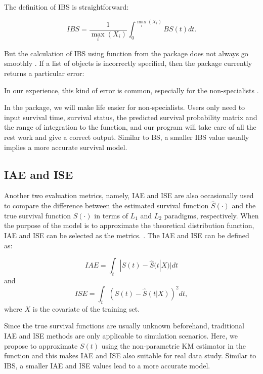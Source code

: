 The definition of IBS is straightforward:

\begin{equation}\label{IBS}
  IBS=\frac{1}{\max\limits_i{(X_i)}} \int_0^{\max\limits_i(X_i)}BS(t)dt.
\end{equation}

But the calculation of IBS using  function from the  package does not always go smoothly \citep{ipred.2009} . If a list of  objects is incorrectly specified, then the package currently returns a particular error:


In our experience, this kind of error is common, especially for the non-specialists \citep{ipred.2009}.

In the  package,  we will make life easier for non-specialists.  Users only need to input survival time, survival status, the predicted survival probability matrix and the range of integration to the  function, and our program will take care of all the rest work and give a correct output. Similar to BS, a smaller IBS value usually implies a more accurate survival model.

\subsection{IAE and ISE}

Another two evaluation metrics, namely, IAE and ISE are also occasionally used to compare the difference between the estimated survival function $\hat{S}(\cdot)$ and the true survival function $S(\cdot)$ in terms of $L_1$ and $L_2$ paradigms, respectively. When the purpose of the model is to approximate the theoretical distribution function, IAE and ISE can be selected as the metrics. \cite{Hoora.2017, Zou.2021}.  The IAE and ISE can be defined as:

\begin{equation}\label{IAE}
  IAE=\int_{t}|S(t)-\hat{S}(t|X)| dt
\end{equation}
and
\begin{equation}\label{ISE}
  ISE =\int_{t}(S(t)-\hat{S}(t|X))^{2} dt,
\end{equation}
where $X$ is the covariate of the training set.

Since the true survival functions are usually unknown beforehand, traditional IAE and ISE methods are only applicable to simulation scenarios.  Here, we propose to approximate $S(t)$ using the non-parametric KM estimator in the  function and this makes IAE and ISE also suitable for real data study. Similar to IBS, a smaller IAE and ISE values lead to a more accurate model.


